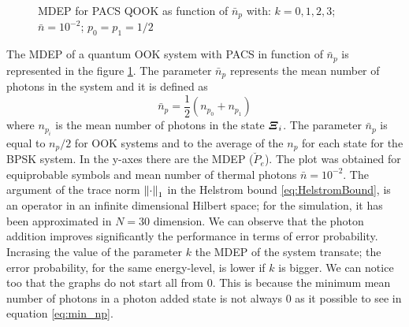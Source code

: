     \begin{figure}[t]
        \begin{center}
            
            \caption{MDEP for PACS QOOK as function of $\bar{n}_p$ with: $k=0,1,2,3$; $\bar{n}=10^{-2}$; $p_0=p_1=1/2$}
            \label{fig:3.1}
        \end{center}
    \end{figure}
    The MDEP of a quantum OOK system with PACS in function of $\bar{n}_p$ is represented in the figure
    \ref{fig:3.1}. The parameter $\bar{n}_p$ represents the mean number of photons in the system and it is 
    defined as
    \begin{equation*}
        \bar{n}_p=\frac{1}{2} \left(n_{p_0}+n_{p_1}\right)
    \end{equation*}
    where $n_{p_i}$ is the mean number of photons in the state $\bm{\relax{\varXi}}_i$.
    The parameter $\bar{n}_p$ is equal to $n_p/2$ for OOK systems and to the average of the $n_p$ for 
    each state for the BPSK system.
    In the y-axes there are the MDEP ($\breve{P}_e$). The plot was obtained for equiprobable symbols and 
    mean number of thermal photons $\bar{n}=10^{-2}$.  
    The argument of the trace norm $\norm{\cdot}_1$ in the Helstrom bound 
    \ref{eq:HelstromBound}, is an operator in an infinite dimensional Hilbert space; for the 
    simulation, it has been approximated in $N=30$ dimension.
    We can observe that the photon addition improves significantly the performance in terms
    of error probability. Incrasing the value of the parameter $k$ the MDEP of the system 
    transate; the error probability, for the same energy-level, is lower if $k$ is bigger.
    We can notice too that the graphs do not start all from $0$. This is because the minimum
    mean number of photons in a photon added state is not always $0$ as it possible to see in 
    equation \ref{eq:min_np}.  

